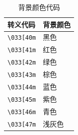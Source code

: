 \begin{table}[H]
	\centering
	\begin{tabular}{|l|l|}
		\hline
		\textbf{转义代码}   & \textbf{背景颜色} \\
		\hline
		\verb|\033[40m| & 黑色            \\
		\verb|\033[41m| & 红色            \\
		\verb|\033[42m| & 绿色            \\
		\verb|\033[43m| & 棕色            \\
		\verb|\033[44m| & 蓝色            \\
		\verb|\033[45m| & 紫色            \\
		\verb|\033[46m| & 青色            \\
		\verb|\033[47m| & 浅灰色           \\
		\hline
	\end{tabular}
	\caption{背景颜色代码}
\end{table}

